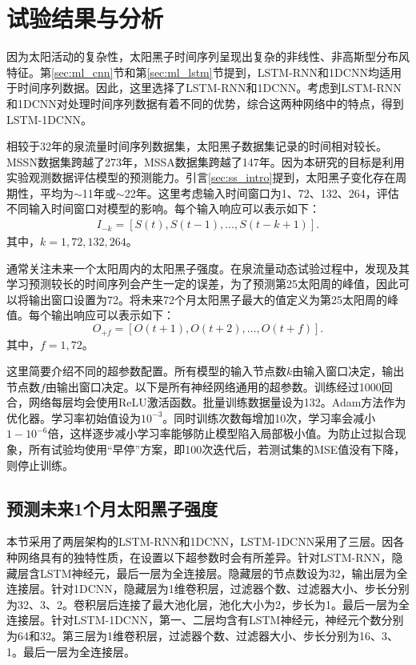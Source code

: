 \section{试验结果与分析}\label{sec:ss_result}

因为太阳活动的复杂性，太阳黑子时间序列呈现出复杂的非线性、非高斯型分布风特征。第\ref{sec:ml_cnn}节和第\ref{sec:ml_lstm}节提到，LSTM-RNN和1DCNN均适用于时间序列数据。因此，这里选择了LSTM-RNN和1DCNN。考虑到LSTM-RNN和1DCNN对处理时间序列数据有着不同的优势，综合这两种网络中的特点，得到LSTM-1DCNN。

相较于32年的泉流量时间序列数据集，太阳黑子数据集记录的时间相对较长。MSSN数据集跨越了273年，MSSA数据集跨越了147年。因为本研究的目标是利用实验观测数据评估模型的预测能力。引言\ref{sec:ss_intro}提到，太阳黑子变化存在周期性，平均为$\sim$11年或$\sim$22年。这里考虑输入时间窗口为1、72、132、264，评估不同输入时间窗口对模型的影响。每个输入响应可以表示如下：
\begin{equation}
  \label{eq:ss_input}
  \begin{split}
    I_{-k}=[S(t),S(t-1),\ldots,S(t-k+1)].
  \end{split}
\end{equation}
其中，$k=1,72,132,264$。

通常关注未来一个太阳周内的太阳黑子强度。在泉流量动态试验过程中，发现及其学习预测较长的时间序列会产生一定的误差，为了预测第25太阳周的峰值，因此可以将输出窗口设置为72。将未来72个月太阳黑子最大的值定义为第25太阳周的峰值。每个输出响应可以表示如下：
\begin{equation}
  \label{eq:ss_output}
  O_{+f}=[O(t+1),O(t+2),\ldots,O(t+f)].
\end{equation}
其中，$f=1,72$。

这里简要介绍不同的超参数配置。所有模型的输入节点数$k$由输入窗口决定，输出节点数$f$由输出窗口决定。以下是所有神经网络通用的超参数。训练经过1000回合，网络每层均会使用ReLU激活函数。批量训练数据量设为132。Adam方法作为优化器。学习率初始值设为$10^{-3}$。同时训练次数每增加10次，学习率会减小$1-10^{-6}$倍，这样逐步减小学习率能够防止模型陷入局部极小值。为防止过拟合现象，所有试验均使用“早停”方案，即100次迭代后，若测试集的MSE值没有下降，则停止训练。

\subsection{预测未来1个月太阳黑子强度}\label{sec:ss_result_1}

本节采用了两层架构的LSTM-RNN和1DCNN，LSTM-1DCNN采用了三层。因各种网络具有的独特性质，在设置以下超参数时会有所差异。针对LSTM-RNN，隐藏层含LSTM神经元，最后一层为全连接层。隐藏层的节点数设为32，输出层为全连接层。针对1DCNN，隐藏层为1维卷积层，过滤器个数、过滤器大小、步长分别为32、3、2。卷积层后连接了最大池化层，池化大小为2，步长为1。最后一层为全连接层。针对LSTM-1DCNN，第一、二层均含有LSTM神经元，神经元个数分别为64和32。第三层为1维卷积层，过滤器个数、过滤器大小、步长分别为16、3、1。最后一层为全连接层。 

